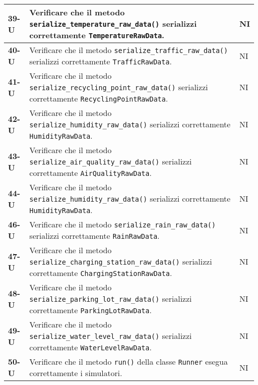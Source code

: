 \begin{longtable}{|>{\raggedright\arraybackslash}m{}|>{\raggedright\arraybackslash}m{}|>{\raggedright\arraybackslash}m{}|}
	\hline
	\textbf{39-U}   & Verificare che il metodo \texttt{serialize\_temperature\_raw\_data()} serializzi correttamente \texttt{TemperatureRawData}.                                       & NI             \\
	\hline
	\textbf{40-U}   & Verificare che il metodo \texttt{serialize\_traffic\_raw\_data()} serializzi correttamente \texttt{TrafficRawData}.                                               & NI             \\
	\hline
	\textbf{41-U}   & Verificare che il metodo \texttt{serialize\_recycling\_point\_raw\_data()} serializzi correttamente \texttt{RecyclingPointRawData}.                               & NI             \\
	\hline
	\textbf{42-U}   & Verificare che il metodo \texttt{serialize\_humidity\_raw\_data()} serializzi correttamente \texttt{HumidityRawData}.                                             & NI             \\
	\hline
	\textbf{43-U}   & Verificare che il metodo \texttt{serialize\_air\_quality\_raw\_data()} serializzi correttamente \texttt{AirQualityRawData}.                                       & NI             \\
	\hline
	\textbf{44-U}   & Verificare che il metodo \texttt{serialize\_humidity\_raw\_data()} serializzi correttamente \texttt{HumidityRawData}.                                             & NI             \\
	\hline
	\textbf{46-U}   & Verificare che il metodo \texttt{serialize\_rain\_raw\_data()} serializzi correttamente \texttt{RainRawData}.                                                     & NI             \\
	\hline
	\textbf{47-U}   & Verificare che il metodo \texttt{serialize\_charging\_station\_raw\_data()} serializzi correttamente \texttt{ChargingStationRawData}.                             & NI             \\
	\hline
	\textbf{48-U}   & Verificare che il metodo \texttt{serialize\_parking\_lot\_raw\_data()} serializzi correttamente \texttt{ParkingLotRawData}.                                       & NI             \\
	\hline
	\textbf{49-U}   & Verificare che il metodo \texttt{serialize\_water\_level\_raw\_data()} serializzi correttamente \texttt{WaterLevelRawData}.                                       & NI             \\
	\hline
	\textbf{50-U}   & Verificare che il metodo \texttt{run()} della classe \texttt{Runner} esegua correttamente i simulatori.                                                           & NI             \\

\end{longtable}
